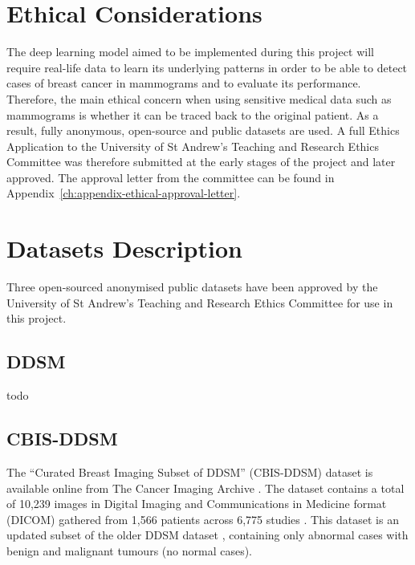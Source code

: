 \section{Ethical Considerations}

The deep learning model aimed to be implemented during this project will require real-life data to learn its underlying patterns in order to be able to detect cases of breast cancer in mammograms and to evaluate its performance. Therefore, the main ethical concern when using sensitive medical data such as  mammograms is whether it can be traced back to the original patient. As a result, fully anonymous, open-source and public datasets are used. A full Ethics Application to the University of St Andrew's Teaching and Research Ethics Committee was therefore submitted at the early stages of the project and later approved. The approval letter from the committee can be found in Appendix~\ref{ch:appendix-ethical-approval-letter}.


\section{Datasets Description}

Three open-sourced anonymised public datasets have been approved by the University of St Andrew's Teaching and Research Ethics Committee for use in this project.

\subsection{DDSM}

todo

\subsection{CBIS-DDSM}

The ``Curated Breast Imaging Subset of DDSM'' (CBIS-DDSM) dataset \citep{Lee2017} is available online from The Cancer Imaging Archive \citep{Clark2013}. The dataset contains a total of 10,239 images in Digital Imaging and Communications in Medicine format (DICOM) gathered from 1,566 patients across 6,775 studies \citep{Lee2017}. This dataset is an updated subset of the older DDSM dataset \citep{DDSMdataset2001}, containing only abnormal cases with benign and malignant tumours (no normal cases).\\

